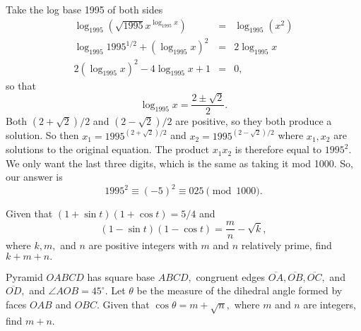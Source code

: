 \begin{solution}[name={Solution by joml88}]
	Take the log base 1995 of both sides
	\begin{eqnarray*} \log_{1995}\left(\sqrt{1995}x^{\log_{1995}x}\right) &=& \log_{1995}(x^2)\\ \log_{1995}1995^{1/2}+(\log_{1995}x)^2 &=& 2\log_{1995}x\\ 2(\log_{1995}x)^2-4\log_{1995}x+1 &=& 0, \end{eqnarray*}
	so that $$\log_{1995}x=\frac{2\pm \sqrt{2}}2.$$
	Both $(2+\sqrt{2})/2$ and $(2-\sqrt{2})/2$ are positive, so they both produce a solution. So then $x_1=1995^{(2+\sqrt{2})/2}$ and $x_2=1995^{(2-\sqrt{2})/2}$ where $x_1, x_2$ are solutions to the original equation. The product $x_1x_2$ is therefore equal to $1995^2.$ We only want the last three digits, which is the same as taking it mod 1000. So, our answer is $$1995^2\equiv (-5)^2\equiv \boxed{025}\pmod{1000}.$$
\end{solution}










\begin{question}[name={1995 AIME, \href{https://artofproblemsolving.com/community/c4p394507}{Problem 7}}]
	Given that $(1+\sin t)(1+\cos t)=5/4$ and\[ (1-\sin t)(1-\cos t)=\frac mn-\sqrt{k}, \]where $k, m,$ and $n$ are positive integers with $m$ and $n$ relatively prime, find $k+m+n.$
\end{question}


%	













\begin{question}[name={1995 AIME, \href{https://artofproblemsolving.com/community/c4p394525}{Problem 12}}]
	Pyramid $OABCD$ has square base $ABCD,$ congruent edges $\overline{OA}, \overline{OB}, \overline{OC},$ and $\overline{OD},$ and $\angle AOB=45^\circ.$ Let $\theta$ be the measure of the dihedral angle formed by faces $OAB$ and $OBC.$ Given that $\cos \theta=m+\sqrt{n},$ where $m$ and $n$ are integers, find $m+n.$	
\end{question}


